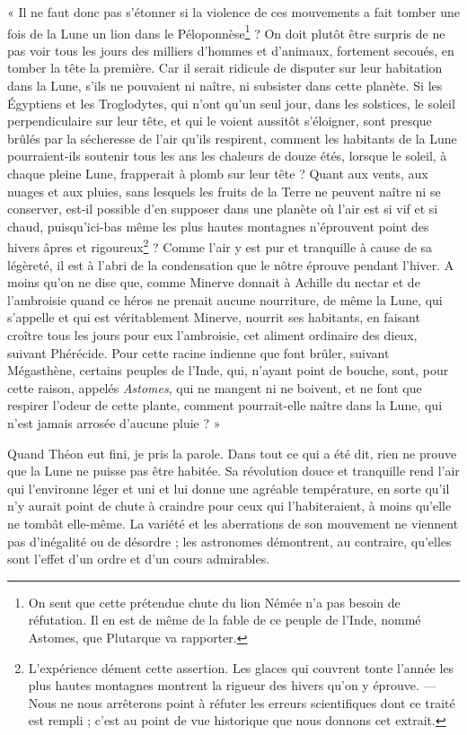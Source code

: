 \documentclass[a4paper, 11pt, oneside, landscape]{article}
\begin{document}
« Il ne faut donc pas s'étonner si la violence de ces mouvements a fait tomber une fois de la Lune un lion dans le Péloponnèse\footnote{On sent que cette prétendue chute du lion Némée n'a pas besoin de réfutation. Il en est de même de la fable de ce peuple de l'Inde, nommé Astomes, que Plutarque va rapporter.} ? On doit plutôt être surpris de ne pas voir tous les jours des milliers d'hommes et d'animaux, fortement secoués, en tomber la tête la première. Car il serait ridicule de disputer sur leur habitation dans la Lune, s'ils ne pouvaient ni naître, ni subsister dans cette planète. Si les Égyptiens et les Troglodytes, qui n'ont qu'un seul jour, dans les solstices, le soleil perpendiculaire sur leur tête, et qui le voient aussitôt s'éloigner, sont presque brûlés par la sécheresse de l'air qu'ils respirent, comment les habitants de la Lune pourraient-ils soutenir tous les ans les chaleurs de douze étés, lorsque le soleil, à chaque pleine Lune, frapperait à plomb sur leur tête ? Quant aux vents, aux nuages et aux pluies, sans lesquels les fruits de la Terre ne peuvent naître ni se conserver, est-il possible d'en supposer dans une planète où l'air est si vif et si chaud, puisqu'ici-bas même les plus hautes montagnes n'éprouvent point des hivers âpres et rigoureux\footnote{L'expérience dément cette assertion. Les glaces qui couvrent tonte l'année les plus hautes montagnes montrent la rigueur des hivers qu'on y éprouve. --- Nous ne nous arrêterons point à réfuter les erreurs scientifiques dont ce traité est rempli ; c'est au point de vue historique que nous donnons cet extrait.} ? Comme l'air y est pur et tranquille à cause de sa légèreté, il est à l'abri de la condensation que le nôtre éprouve pendant l'hiver. A moins qu'on ne dise que, comme Minerve donnait à Achille du nectar et de l'ambroisie quand ce héros ne prenait aucune nourriture, de même la Lune, qui s'appelle et qui est véritablement Minerve, nourrit ses habitants, en faisant croître tous les jours pour eux l'ambroisie, cet aliment ordinaire des dieux, suivant Phérécide. Pour cette racine indienne que font brûler, suivant Mégasthène, certains peuples de l'Inde, qui, n'ayant point de bouche, sont, pour cette raison, appelés \emph{Astomes}, qui ne mangent ni ne boivent, et ne font que respirer l'odeur de cette plante, comment pourrait-elle naître dans la Lune, qui n'est jamais arrosée d'aucune pluie ? »

Quand Théon eut fini, je pris la parole. Dans tout ce qui a été dit, rien ne prouve que la Lune ne puisse pas être habitée. Sa révolution douce et tranquille rend l'air qui l'environne léger et uni et lui donne une agréable température, en sorte qu'il n'y aurait point de chute à craindre pour ceux qui l'habiteraient, à moins qu'elle ne tombât elle-même. La variété et les aberrations de son mouvement ne viennent pas d'inégalité ou de désordre ; les astronomes démontrent, au contraire, qu'elles sont l'effet d'un ordre et d'un cours admirables.
\end{document}

